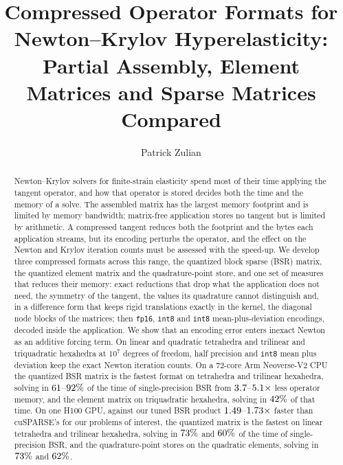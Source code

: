 \documentclass[sigconf,review]{acmart}
\begin{document}
\title{Compressed Operator Formats for Newton--Krylov Hyperelasticity: Partial Assembly, Element
Matrices and Sparse Matrices Compared}

\author{Patrick Zulian}

\begin{abstract}
Newton--Krylov solvers for finite-strain elasticity spend most of their time applying the tangent
operator, and how that operator is stored decides both the time and the memory of a solve.  The
assembled matrix has the largest memory footprint and is limited by memory bandwidth; matrix-free
application stores no tangent but is limited by arithmetic.  A compressed tangent reduces both the
footprint and the bytes each application streams, but its encoding perturbs the operator, and the
effect on the Newton and Krylov iteration counts must be assessed with the speed-up.  We develop
three compressed formats across this range, the quantized block sparse (BSR) matrix, the quantized
element matrix and the quadrature-point store, and one set of measures that reduces their memory:
exact reductions that drop what the application does not need, the symmetry of the tangent, the
values its quadrature cannot distinguish and, in a difference form that keeps rigid translations
exactly in the kernel, the diagonal node blocks of the matrices; then \texttt{fp16}, \texttt{int8}
and \texttt{int8} mean-plus-deviation encodings, decoded inside the application.  We show that an encoding error enters
inexact Newton as an additive forcing term.  On linear and quadratic tetrahedra and trilinear and
triquadratic hexahedra at $10^7$ degrees of freedom, half precision and \texttt{int8} mean plus
deviation keep the exact Newton iteration counts.  On a 72-core Arm Neoverse-V2 CPU the quantized
BSR matrix is the fastest format on tetrahedra and trilinear hexahedra, solving in
$61$--$92\%$ of the time of single-precision BSR from
$3.7$--$5.1\times$ less operator memory, and
the element matrix on triquadratic hexahedra, solving in $42\%$ of that time.  On one H100 GPU,
against our tuned BSR product $1.49$--$1.73\times$ faster than
cuSPARSE's for our problems of interest, the quantized matrix is the fastest on linear tetrahedra and trilinear hexahedra,
solving in $73\%$ and $60\%$ of the time of single-precision BSR, and the
quadrature-point stores on the quadratic elements, solving in $73\%$ and
$62\%$.
\end{abstract}
\end{document}
